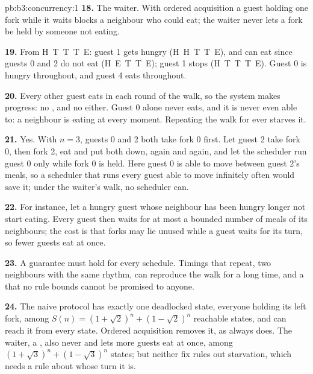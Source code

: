 \begin{solution}{pb:b3:concurrency:1}
\textbf{18.} The waiter. With ordered acquisition a guest holding one fork while it waits blocks a neighbour who could eat; the waiter never lets a fork be held by someone not eating.

\textbf{19.} From H~T~T~T~E: guest 1 gets hungry (H~H~T~T~E), and can eat since guests 0 and 2 do not eat (H~E~T~T~E); guest 1 stops (H~T~T~T~E). Guest 0 is hungry throughout, and guest 4 eats throughout.

\textbf{20.} Every other guest eats in each round of the walk, so the system makes progress: no , and no  either. Guest 0 alone never eats, and it is never even able to: a neighbour is eating at every moment. Repeating the walk for ever starves it.

\textbf{21.} Yes. With $n = 3$, guests 0 and 2 both take fork 0 first. Let guest 2 take fork 0, then fork 2, eat and put both down, again and again, and let the scheduler run guest 0 only while fork 0 is held. Here guest 0 is able to move between guest 2's meals, so a scheduler that runs every guest able to move infinitely often would save it; under the waiter's walk, no scheduler can.

\textbf{22.} For instance, let a hungry guest whose neighbour has been hungry longer not start eating. Every guest then waits for at most a bounded number of meals of its neighbours; the cost is that forks may lie unused while a guest waits for its turn, so fewer guests eat at once.

\textbf{23.} A guarantee must hold for every schedule. Timings that repeat, two neighbours with the same rhythm, can reproduce the walk for a long time, and a  that no rule bounds cannot be promised to anyone.

\textbf{24.} The naive protocol has exactly one deadlocked state, everyone holding its left fork, among $S(n) = (1 + \sqrt{2})^n + (1 - \sqrt{2})^n$ reachable states, and can reach it from every state. Ordered acquisition removes it, as  always does. The waiter, a , also never  and lets more guests eat at once, among $(1 + \sqrt{3})^n + (1 - \sqrt{3})^n$ states; but neither fix rules out starvation, which needs a rule about whose turn it is.
\end{solution}
